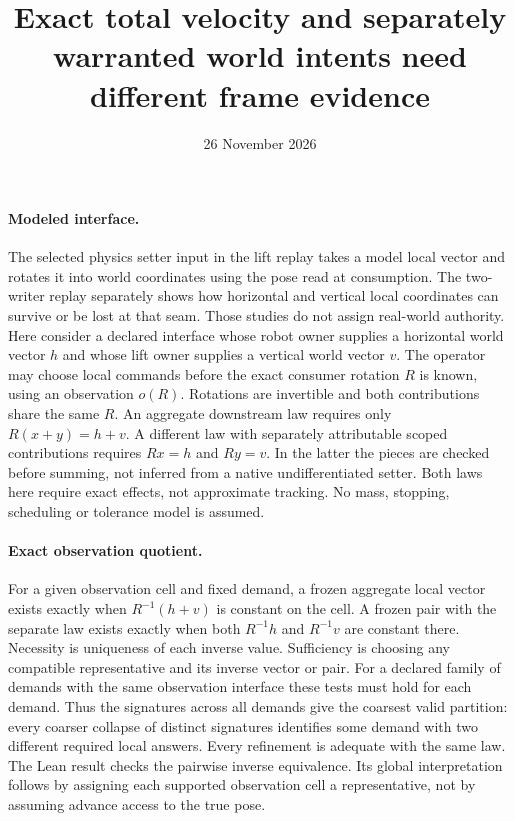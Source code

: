 \documentclass[11pt]{article}
\title{Exact total velocity and separately warranted world intents need different frame evidence}
\date{26 November 2026}
\begin{document}
\maketitle
\paragraph{Modeled interface.}
The selected physics setter input in the lift replay takes a model
local vector and rotates it into world coordinates using the pose
read at consumption. The two-writer replay separately shows how
horizontal and vertical local coordinates can survive or be lost at
that seam. Those studies do not assign real-world authority. Here
consider a declared interface whose robot owner supplies a horizontal
world vector $h$ and whose lift owner supplies a vertical world
vector $v$. The operator may choose local commands before the exact
consumer rotation $R$ is known, using an observation $o(R)$.
Rotations are invertible and both contributions share the same $R$.
An aggregate downstream law requires only $R(x+y)=h+v$.
A different law with separately attributable scoped contributions
requires $Rx=h$ and $Ry=v$. In the latter the pieces are checked
before summing, not inferred from a native undifferentiated setter.
Both laws here require exact effects, not approximate tracking.
No mass, stopping, scheduling or tolerance model is assumed.

\paragraph{Exact observation quotient.}
For a given observation cell and fixed demand, a frozen aggregate
local vector exists exactly when $R^{-1}(h+v)$ is constant on the
cell. A frozen pair with the separate law exists exactly when both
$R^{-1}h$ and $R^{-1}v$ are constant there. Necessity is uniqueness
of each inverse value. Sufficiency is choosing any compatible
representative and its inverse vector or pair. For a declared family
of demands with the same observation interface these tests must
hold for each demand. Thus the signatures across all demands give
the coarsest valid partition: every coarser collapse of distinct
signatures identifies some demand with two different required
local answers. Every refinement is adequate with the same law.
The Lean result checks the pairwise inverse equivalence. Its global
interpretation follows by assigning each supported observation cell
a representative, not by assuming advance access to the true pose.
\end{document}
